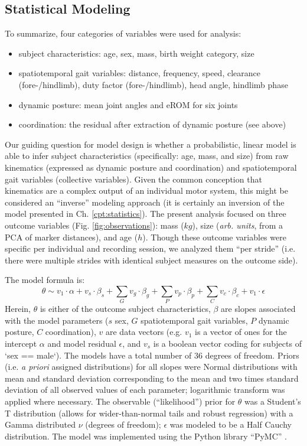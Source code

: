 \subsection{Statistical Modeling}
\label{sec:org7326405}
To summarize, four categories of variables were used for analysis:
\begin{itemize}
\item subject characteristics: age, sex, mass, birth weight category, size
\item spatiotemporal gait variables: distance, frequency, speed, clearance (fore-/hindlimb), duty factor (fore-/hindlimb), head angle, hindlimb phase
\item dynamic posture: mean joint angles and eROM for six joints
\item coordination: the residual after extraction of dynamic posture (see above)
\end{itemize}

Our guiding question for model design is whether a probabilistic, linear model is able to infer subject characteristics (specifically: age, mass, and size) from raw kinematics (expressed as dynamic posture and coordination) and spatiotemporal gait variables (collective variables).
Given the common conception that kinematics are a complex output of an individual motor system, this might be considered an ``inverse'' modeling approach (it is certainly an inversion of the model presented in Ch. \ref{cpt:statistics}).
The present analysis focused on three outcome variables (Fig. \ref{fig:observations}): mass (\(kg\)), size (\emph{arb. units}, from a PCA of marker distances), and age (\(h\)).
Though these outcome variables were specific per individual and recording session, we analyzed them ``per stride'' (i.e. there were multiple strides with identical subject measures on the outcome side).


The model formula is:
\begin{equation} \theta \sim v_{1}\cdot\alpha + v_{s}\cdot\beta_{s} + \sum\limits_{G} v_{g}\cdot\beta_{g} + \sum\limits_{P}  v_{p}\cdot\beta_{p} +  \sum\limits_{C} v_{c}\cdot\beta_{c} + v_{1}\cdot\epsilon \label{eq:model} \end{equation}
Herein, \(\theta\) is either of the outcome subject characteristics, \(\beta\) are slopes associated with the model parameters (\(s\) sex, \(G\) spatiotemporal gait variables, \(P\) dynamic posture, \(C\) coordination), \(v\) are data vectors (e.g. \(v_{1}\) is a vector of ones for the intercept \(\alpha\) and model residual \(\epsilon\), and \(v_{s}\) is a boolean vector coding for subjects of `sex == male`).
The models have a total number of 36 degrees of freedom.
Priors (i.e. \emph{a priori} assigned distributions) for all slopes were Normal distributions with mean and standard deviation corresponding to the mean and two times standard deviation of all observed values of each parameter; logarithmic transform was applied where necessary.
The observable (``likelihood'') prior for \(\theta\) was a Student's T distribution (allows for wider-than-normal tails and robust regression) with a Gamma distributed \(\nu\) (degrees of freedom); \(\epsilon\) was modeled to be a Half Cauchy distribution.
The model was implemented using the Python library ``PyMC'' \citep[version 4.2.2,][]{Salvatier2016}.


